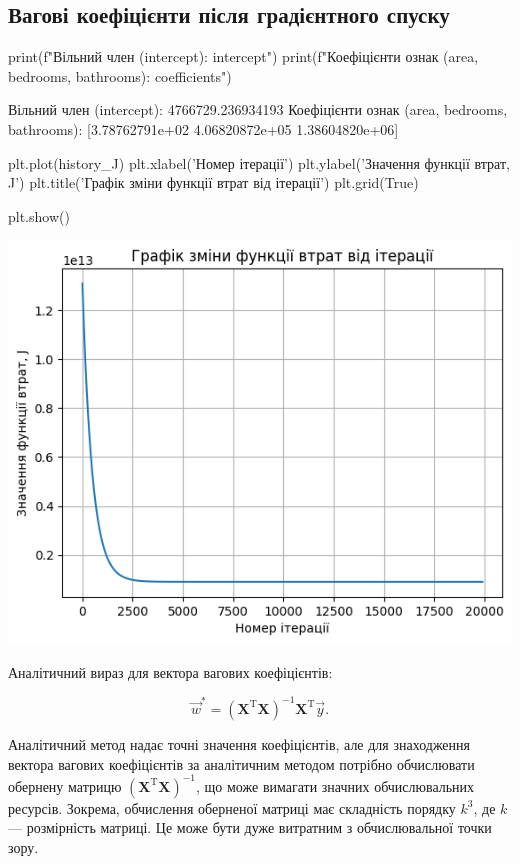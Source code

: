 \documentclass[]{article}
\newcounter{pythoncode}
\begin{document}
\subsection{Вагові коефіцієнти після градієнтного спуску}

\begin{pythoncode}
print(f"Вільний член (intercept): {intercept}")
print(f"Коефіцієнти ознак (area, bedrooms, bathrooms): {coefficients}")
\end{pythoncode}

\begin{out}
	Вільний член (intercept): 4766729.236934193
	Коефіцієнти ознак (area, bedrooms, bathrooms): [3.78762791e+02 4.06820872e+05
	1.38604820e+06]
\end{out}

\begin{pythoncode}
plt.plot(history_J)
plt.xlabel('Номер ітерації')
plt.ylabel('Значення функції втрат, J')
plt.title('Графік зміни функції втрат від ітерації')
plt.grid(True)

plt.show()
\end{pythoncode}

\begin{center}
	\includegraphics[width=0.6\linewidth]{hw3_files/hw3_22_0.png}
\end{center}

Аналітичний вираз для вектора вагових коефіцієнтів:

\[ \vec{w}^* = \left(\mathbf{X}^{\mathrm{T}} \mathbf{X}\right)^{-1}\mathbf{X}^{\mathrm{T}} \vec{y}. \]

Аналітичний метод надає точні значення коефіцієнтів, але для знаходження
вектора вагових коефіцієнтів за аналітичним методом потрібно обчислювати
обернену матрицю
\(\left(\mathbf{X}^{\mathrm{T}} \mathbf{X}\right)^{-1}\), що може
вимагати значних обчислювальних ресурсів. Зокрема, обчислення оберненої
матриці має складність порядку \(k^3\), де \(k\) --- розмірність матриці.
Це може бути дуже витратним з обчислювальної точки зору.
\end{document}
